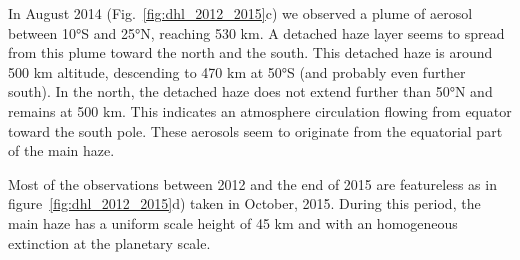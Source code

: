 In August 2014 (Fig.~\ref{fig:dhl_2012_2015}c) we observed a plume of aerosol between \ang{10}S and \ang{25}N,
reaching 530 km. A detached haze layer seems to spread from this plume toward the north and the south. This
detached haze is around 500 km altitude, descending to 470 km at \ang{50}S (and probably even further south). In the
north, the detached haze does not extend further than \ang{50}N and remains at 500 km. This indicates an
atmosphere circulation flowing from equator toward the south pole. These aerosols seem to originate
from the equatorial part of the main haze.

Most of the observations between 2012 and the end of 2015 are featureless as in figure~\ref{fig:dhl_2012_2015}d)
taken in October, 2015. During this period, the main haze has a uniform scale height of 45 km and
with an homogeneous extinction at the planetary scale.

